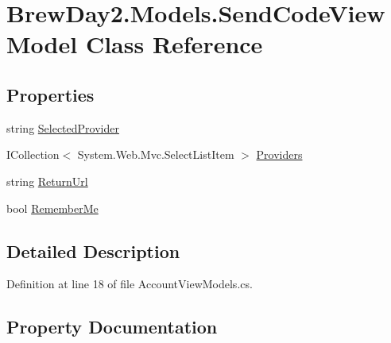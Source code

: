 \hypertarget{class_brew_day2_1_1_models_1_1_send_code_view_model}{}\section{Brew\+Day2.\+Models.\+Send\+Code\+View\+Model Class Reference}
\label{class_brew_day2_1_1_models_1_1_send_code_view_model}
\subsection*{Properties}
\begin{DoxyCompactItemize}
\item 
string \mbox{\hyperlink{class_brew_day2_1_1_models_1_1_send_code_view_model_acf7e479efa390c94a2b8525f5ccdaa71}{Selected\+Provider}}
\item 
I\+Collection$<$ System.\+Web.\+Mvc.\+Select\+List\+Item $>$ \mbox{\hyperlink{class_brew_day2_1_1_models_1_1_send_code_view_model_a1c436ad2782b2d7a163ac5b28decf656}{Providers}}
\item 
string \mbox{\hyperlink{class_brew_day2_1_1_models_1_1_send_code_view_model_ab2ae0e75b529bf606af0befd5ff295d5}{Return\+Url}}
\item 
bool \mbox{\hyperlink{class_brew_day2_1_1_models_1_1_send_code_view_model_aa5ce72d50833eeadc58e57b25d87a2dd}{Remember\+Me}}
\end{DoxyCompactItemize}


\subsection{Detailed Description}


Definition at line 18 of file Account\+View\+Models.\+cs.



\subsection{Property Documentation}
\mbox{\label{class_brew_day2_1_1_models_1_1_send_code_view_model_a1c436ad2782b2d7a163ac5b28decf656}} 
